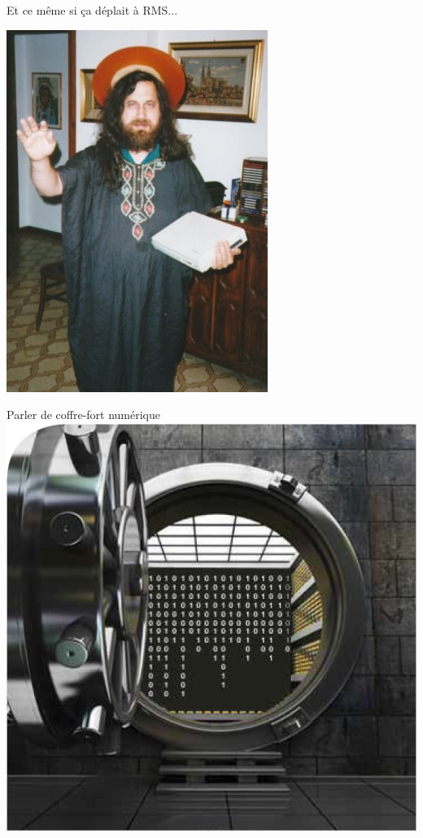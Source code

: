 \documentclass{beamer}
\begin{document}
\begin{frame}
\begin{center}
\huge{Et ce même si ça déplait à RMS...}

\includegraphics[scale=0.5]{./images/saintignucius.jpg}
\end{center}
\end{frame}

\begin{frame}
\begin{center}
\Huge{Parler de coffre-fort numérique}
\includegraphics[scale=0.5]{./images/coffre_fort_numerique.png}
\end{center}
\end{frame}
\end{document}
